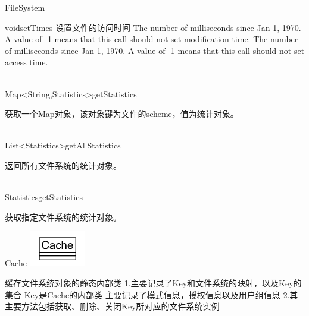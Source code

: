 \begin{XeClass}{FileSystem}
\begin{XeMethod}{\XePublic}{void}{setTimes}
 设置文件的访问时间
 The number of milliseconds since Jan 1, 1970.
 A value of -1 means that this call should not set modification time.
 The number of milliseconds since Jan 1, 1970.
 A value of -1 means that this call should not set access time.

    \end{XeMethod}

    \begin{XeMethod}{\XePublic \\ \XeSync}{Map<String,Statistics>}{getStatistics}
         
 获取一个Map对象，该对象键为文件的scheme，值为统计对象。

    \end{XeMethod}

    \begin{XeMethod}{\XePublic \\ \XeSync}{List<Statistics>}{getAllStatistics}
         
 返回所有文件系统的统计对象。

    \end{XeMethod}

    \begin{XeMethod}{\XePublic \\ \XeSync}{Statistics}{getStatistics}
         
 获取指定文件系统的统计对象。

    \end{XeMethod}


    \begin{XeInnerClass}{Cache}
\includegraphics[width=\textwidth]{cdig/Cache.png}
         
 缓存文件系统对象的静态内部类
 1.主要记录了Key和文件系统的映射，以及Key的集合
 Key是Cache的内部类
 主要记录了模式信息，授权信息以及用户组信息
 2.其主要方法包括获取、删除、关闭Key所对应的文件系统实例


\end{XeInnerClass}
\end{XeClass}
